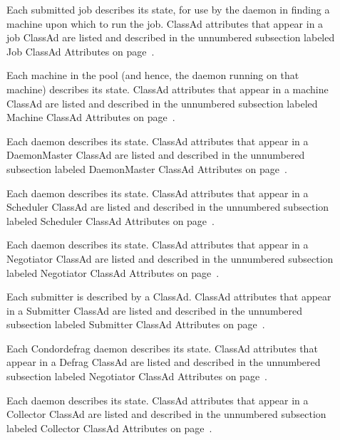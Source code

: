\begin{description}
  \item[]
  Each submitted job describes its state, for use by the
   daemon in finding a machine upon which to
  run the job.
  ClassAd attributes that appear in a job ClassAd are listed and described in
  the unnumbered subsection labeled Job ClassAd Attributes
  on page~\pageref{sec:Job-ClassAd-Attributes}.

  \item[]
   Each machine in the pool (and hence, the  daemon running
   on that machine) describes its state.
  ClassAd attributes that appear in a machine ClassAd 
  are listed and described in
  the unnumbered subsection labeled Machine ClassAd Attributes
  on page~\pageref{sec:Machine-ClassAd-Attributes}.

  \item[]
   Each  daemon describes its state.
  ClassAd attributes that appear in a DaemonMaster ClassAd 
  are listed and described in
  the unnumbered subsection labeled DaemonMaster ClassAd Attributes
  on page~\pageref{sec:DaemonMaster-ClassAd-Attributes}.

  \item[]
   Each  daemon describes its state.
  ClassAd attributes that appear in a Scheduler ClassAd 
  are listed and described in
  the unnumbered subsection labeled Scheduler ClassAd Attributes
  on page~\pageref{sec:Scheduler-ClassAd-Attributes}.

  \item[]
   Each  daemon describes its state.
  ClassAd attributes that appear in a Negotiator ClassAd 
  are listed and described in
  the unnumbered subsection labeled Negotiator ClassAd Attributes
  on page~\pageref{sec:Negotiator-ClassAd-Attributes}.

  \item[]
   Each submitter is described by a ClassAd.
  ClassAd attributes that appear in a Submitter ClassAd 
  are listed and described in
  the unnumbered subsection labeled Submitter ClassAd Attributes
  on page~\pageref{sec:Submitter-ClassAd-Attributes}.

  \item[]
   Each Condor{defrag} daemon describes its state.
  ClassAd attributes that appear in a Defrag ClassAd 
  are listed and described in
  the unnumbered subsection labeled Negotiator ClassAd Attributes
  on page~\pageref{sec:Defrag-ClassAd-Attributes}.

  \item[]
   Each  daemon describes its state.
  ClassAd attributes that appear in a Collector ClassAd 
  are listed and described in
  the unnumbered subsection labeled Collector ClassAd Attributes
  on page~\pageref{sec:Collector-ClassAd-Attributes}.

  \item[]
  \Todo

\end{description}

